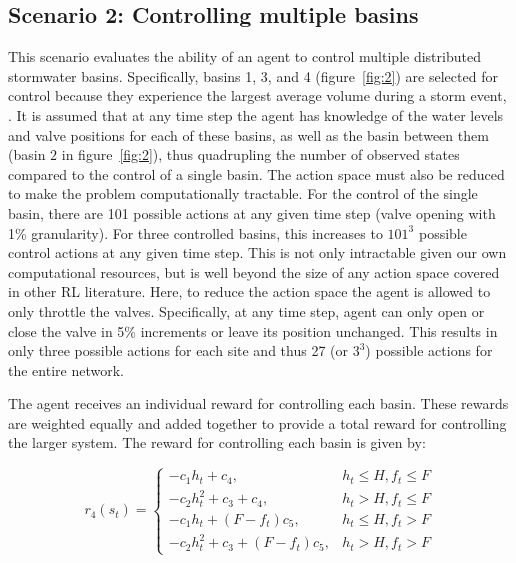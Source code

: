 
\subsection{\textbf{Scenario 2: Controlling multiple basins}}

This scenario evaluates the ability of an agent to control multiple distributed stormwater basins.
Specifically, basins 1, 3, and 4 (figure~\ref{fig:2}) are selected for control because they experience the largest average volume during a storm event, .
It is assumed that at any time step the agent has knowledge of the water levels and valve positions for each of these basins, as well as the basin between them (basin $2$ in figure~\ref{fig:2}), thus quadrupling the number of observed states compared to the control of a single basin.
The action space must also be reduced to make the problem computationally tractable.
For the control of the single basin, there are 101 possible actions at any given time step (valve opening with 1\% granularity).
For three controlled basins, this increases to $101^3$ possible control actions at any given time step. This is not only intractable given our own computational resources, but is well beyond the size of any action space covered in other RL literature.
Here, to reduce the action space the agent is allowed to only throttle the valves. Specifically, at any time step, agent can only open or close the valve in 5\% increments or leave its position unchanged.
This results in only three possible actions for each site and thus 27 (or $3^3$) possible actions for the entire network.



The agent receives an individual reward for controlling each basin. These rewards are weighted equally and added together to provide a total reward for controlling the larger system. The reward for controlling each basin is given by:


\begin{equation}
	r_4 (s_t) = \begin{cases}
		-c_1 h_t+c_4, & h_t \leq H, f_t \leq F \\
		-c_2 h_t^2+c_3+c_4, & h_t > H, f_t \leq F\\
		-c_1 h_t+(F-f_t)c_5, & h_t \leq H ,f_t > F\\
		-c_2 h_t^2+c_3+(F-f_t ) c_5, &  h_t>H ,f_t>F
	\end{cases}
\end{equation}

